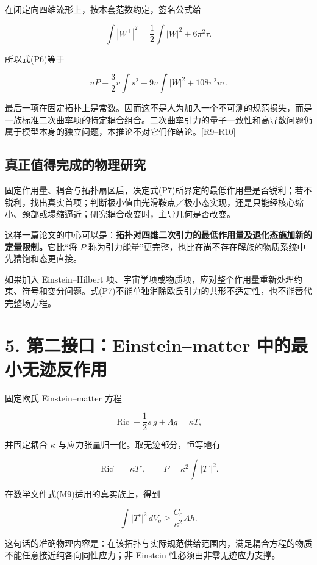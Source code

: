 \documentclass[UTF8,a4paper,11pt,fontset=fandol]{ctexart}
\begin{document}
在闭定向四维流形上，按本套范数约定，签名公式给

\[
\int|W^+|^2=\frac12\int|W|^2+6\pi^2\tau.
\]

所以式(P6)等于

\[
uP+\frac32v\int s^2+9v\int|W|^2+108\pi^2v\tau.
\tag{P8}
\]

最后一项在固定拓扑上是常数。因而这不是人为加入一个不可测的规范损失，而是一族标准二次曲率项的特定耦合组合。二次曲率引力的量子一致性和高导数问题仍属于模型本身的独立问题，本推论不对它们作结论。{[}R9--R10{]}

\subsection{真正值得完成的物理研究}\label{ux771fux6b63ux503cux5f97ux5b8cux6210ux7684ux7269ux7406ux7814ux7a76}

固定作用量、耦合与拓扑扇区后，决定式(P7)所界定的最低作用量是否锐利；若不锐利，找出真实首项；判断极小值由光滑鞍点／极小态实现，还是只能经核心缩小、颈部或塌缩逼近；研究耦合改变时，主导几何是否改变。

这样一篇论文的中心可以是：\textbf{拓扑对四维二次引力的最低作用量及退化态施加新的定量限制。}它比``将
\(P\)
称为引力能量''更完整，也比在尚不存在解族的物质系统中先猜饱和态更直接。

如果加入 Einstein--Hilbert
项、宇宙学项或物质项，应对整个作用量重新处理约束、符号和变分问题。式(P7)不能单独消除欧氏引力的共形不适定性，也不能替代完整场方程。

\section{5. 第二接口：Einstein--matter
中的最小无迹反作用}\label{ux7b2cux4e8cux63a5ux53e3einsteinmatter-ux4e2dux7684ux6700ux5c0fux65e0ux8ff9ux53cdux4f5cux7528}

固定欧氏 Einstein--matter 方程

\[
\operatorname{Ric}-\frac12s\,g+\Lambda g=\kappa T,
\tag{P9}
\]

并固定耦合 \(\kappa\) 与应力张量归一化。取无迹部分，恒等地有

\[
\operatorname{Ric}^{\circ}=\kappa T^{\circ},\qquad
P=\kappa^2\int|T^{\circ}|^2.
\tag{P10}
\]

在数学文件式(M9)适用的真实族上，得到

\[
\boxed{\int|T^{\circ}|^2\,dV_g\ge\frac{C_0}{\kappa^2}Ah.}
\tag{P11}
\]

这句话的准确物理内容是：在该拓扑与实际规范供给范围内，满足耦合方程的物质不能任意接近纯各向同性应力；非
Einstein 性必须由非零无迹应力支撑。
\end{document}
